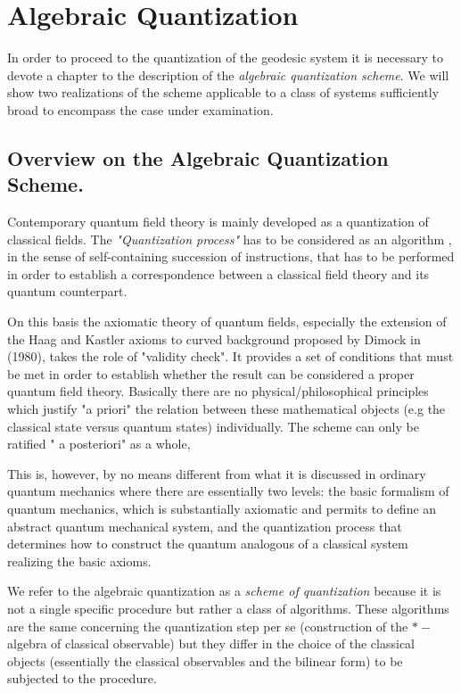 \documentclass[Main]{subfiles}
\begin{document}
\chapter{Algebraic Quantization}
In order to proceed to the quantization of the geodesic system  it is necessary to devote a chapter to the description of the \emph{algebraic quantization scheme}.
We will show two realizations of the scheme applicable to a class of systems sufficiently broad to encompass the %
case under examination.

\section{Overview on the Algebraic Quantization Scheme.}
Contemporary quantum field theory is mainly developed as a quantization of classical fields.
The \emph{"Quantization process"} has to be considered as an algorithm , in the sense of self-containing succession of instructions, that has to be performed in order to establish a correspondence between a classical field theory and its quantum counterpart.

On this basis the axiomatic theory of quantum fields, 
especially the extension of the Haag and Kastler axioms to curved background proposed by Dimock in (1980), 
takes the role of "validity check". 
It provides a set of conditions that must be met in order to establish whether the result can be considered a proper quantum field theory.
Basically there are no physical/philosophical principles which justify "a priori" the relation between these  mathematical objects (e.g the classical state versus quantum states) individually. The scheme can only be ratified " a posteriori" as a whole,%

This is, however, by no means different from what it is discussed in ordinary quantum mechanics where there are essentially two levels:
the basic formalism of quantum mechanics, which is substantially axiomatic and permits to define an abstract quantum mechanical system, and the quantization process that determines how to construct the quantum analogous of a classical system realizing the basic axioms.

We refer to the algebraic quantization as a \emph{scheme of quantization} because it is not a single specific procedure but rather a class of algorithms.
These algorithms are the same concerning the quantization step per se (construction of the $\ast-$algebra of classical observable) but they differ in the choice of the classical objects  (essentially the classical observables and the bilinear form) to be subjected to the procedure.
\end{document}
